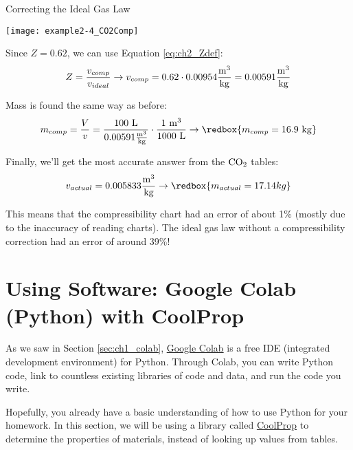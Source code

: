 \begin{example}[label={ex:ch2idealGas}]{Correcting the Ideal Gas Law}
\begin{center}
\texttt{[image: example2-4\_CO2Comp]}
\end{center}

Since $Z=0.62$, we can use Equation \ref{eq:ch2_Zdef}:
\begin{equation*}
  Z = \frac{v_{comp}}{v_{ideal}} \rightarrow v_{comp} = 0.62 \cdot 0.00954 \frac{\rm m^3}{\rm kg} = 0.00591 \frac{\rm m^3}{\rm kg}
\end{equation*}

Mass is found the same way as before:
\begin{equation*}
    m_{comp} = \frac{V}{v} = \frac{100\ \rm L}{0.00591 \frac{\rm m^3}{\rm kg}} \cdot \frac{1\ \rm m^3}{1000\ \rm L} \rightarrow \redbox{m_{comp} = 16.9\ {\rm kg}}
\end{equation*}

Finally, we'll get the most accurate answer from the $\rm CO_2$ tables:
\begin{equation*}
  v_{actual} = 0.005833 \frac{\rm m^3}{\rm kg} \rightarrow \redbox{m_{actual} = 17.14 kg}
\end{equation*}

This means that the compressibility chart had an error of about 1\% (mostly due to the inaccuracy of reading charts). The ideal gas law without a compressibility correction had an error of around 39\%!

\end{example}


\section{Using Software: Google Colab (Python) with CoolProp} \label{sec:ch2_colab}
As we saw in Section \ref{sec:ch1_colab}, \href{https://colab.research.google.com}{Google Colab} is a free IDE (integrated development environment) for Python.  Through Colab, you can write Python code, link to countless existing libraries of code and data, and run the code you write.

Hopefully, you already have a basic understanding of how to use Python for your homework.  In this section, we will be using a library called \href{http://www.coolprop.org/}{CoolProp} to determine the properties of materials, instead of looking up values from tables.

